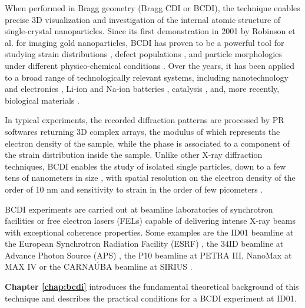 When performed in Bragg geometry (Bragg CDI or BCDI), the technique enables precise 3D visualization and investigation 
of the internal atomic structure of single-crystal nanoparticles. Since its first demonstration in 2001 by Robinson 
et al. \cite{Robinson_gold_2001} for imaging gold nanoparticles, BCDI has proven to be a powerful tool for studying 
strain distributions \cite{pfeifer2006three, Robinson2009, Newton2010}, defect populations \cite{Favre-Nicolin_2010, Labat2015, Dupraz2017}, 
and particle morphologies under different physico-chemical conditions \cite{Carnis2021, FacetStrain2022, Chatelier2024, 
Grimes2024}. Over the years, it has been applied to a broad range of technologically relevant systems, including 
nanotechnology and electronics \cite{Favre-Nicolin_2010}, Li-ion and Na-ion batteries \cite{Singer2018, Serban2024}, 
catalysis \cite{atlan_imaging_2023}, and, more recently, biological materials \cite{Grunewald:ro5042}.

In typical experiments, the recorded diffraction patterns are processed by PR softwares \cite{favre-nicolin_pynx_2020} returning 
3D complex arrays, the modulus of which represents the electron density of the sample, while the phase is associated to
a component of the strain distribution inside the sample. 
Unlike other X-ray diffraction techniques, BCDI enables the study of isolated single particles, down to a few tens of 
nanometers in size \cite{MAXIV60nm, MIR20nm}, with spatial resolution on the electron density of the order of 10 nm \cite{cherukara_anisotropic_2018} 
and sensitivity to strain in the order of few picometers \cite{Labat2015}.

BCDI experiments are carried out at beamline laboratories of synchrotron facilities or free electron lasers (FELs) capable 
of delivering intense X-ray beams with exceptional coherence properties. Some examples are the ID01 beamline at the European 
Synchrotron Radiation Facility (ESRF) \cite{leake_nanodiffraction_2019}, the 34ID beamline at Advance Photon Source (APS) \cite{Pateras:yi5095}, the P10 beamline at PETRA III, 
NanoMax at MAX IV \cite{MAXIV60nm} or the CARNAÚBA beamline at SIRIUS \cite{Tolentino_2017}. 

\textbf{Chapter \ref*{chap:bcdi}} introduces the fundamental theoretical background of this technique and 
describes the practical conditions for a BCDI experiment at ID01.

